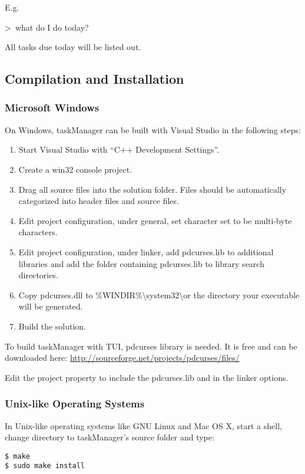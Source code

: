 \documentclass[12pt, a4paper]{article}
\begin{document}
E.g.

    \textgreater \ what do I do today?

All tasks due today will be listed out.    

\subsection{Compilation and Installation}
\subsubsection{Microsoft Windows}

On Windows, taskManager can be built with Visual Studio in the following steps:
\begin{enumerate}
\item Start Visual Studio with ``C++ Development Settings''.
\item Create a win32 console project.
\item Drag all source files into the solution folder. Files should be automatically categorized into header files and source files.
\item Edit project configuration, under general, set character set to be multi-byte characters.
\item Edit project configuration, under linker, add pdcurses.lib to additional libraries and add the folder containing pdcurses.lib to library search directories.
\item Copy pdcurses.dll to \%WINDIR\%\textbackslash system32\textbackslash or the directory your executable will be generated.
\item Build the solution.
\end{enumerate}

To build taskManager with TUI, pdcurses library is needed.
It is free and can be downloaded here:
\url{http://sourceforge.net/projects/pdcurses/files/}

Edit the project property to include the pdcurses.lib and in the linker options.

\subsubsection{Unix-like Operating Systems}

In Unix-like operating systems like GNU Linux and Mac OS X, start a shell, change directory to taskManager's source folder and type:

\texttt{\$ make\\
  \$ sudo make install}
\end{document}
